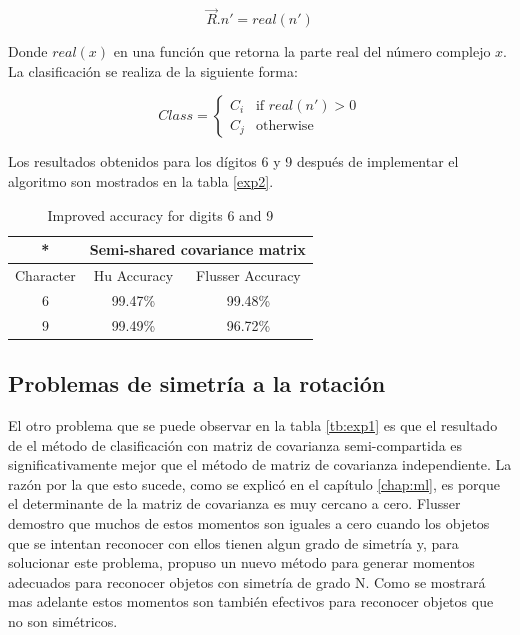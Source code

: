 \documentclass[a4paper, 11pt, oneside]{report}
\begin{document}
	\[ \vec{R}.n' = real(n') \]

Donde $real(x)$ en una función que retorna la parte real del número complejo $x$. La clasificación se realiza de la siguiente forma:

	\begin{equation}\label{angleClassif}
		Class = \left\{ \begin{array}{ll}
		C_i   & \mbox{if $real(n') > 0$} \\
		C_j & \mbox{otherwise}
	\end{array} \right. 
	\end{equation}

Los resultados obtenidos para los dígitos 6 y 9 después de implementar el algoritmo son mostrados en la tabla \ref{exp2}.	

	\begin{table}
	\begin{center}
	\begin{tabular}{|c|c|c|}
		\hline
		* & \multicolumn{2}{|c|}{Semi-shared covariance matrix} \\
		\hline
		Character & Hu Accuracy & Flusser Accuracy \\
		\hline
		6 & 99.47\% & 99.48\%	\\
		9 &	99.49\% & 96.72\% \\
		\hline
	\end{tabular}
	\end{center}
	\caption{Improved accuracy for digits 6 and 9}	
	\label{tb:exp2}
	\end{table}

\subsection{Problemas de simetría a la rotación}

El otro problema que se puede observar en la tabla \ref{tb:exp1} es que el resultado de el método de clasificación con matriz de covarianza semi-compartida es significativamente mejor que el método de matriz de covarianza independiente. La razón por la que esto sucede, como se explicó en el capítulo \ref{chap:ml}, es porque el determinante de la matriz de covarianza es muy cercano a cero. Flusser \cite{flusser06} demostro que muchos de estos momentos son iguales a cero cuando los objetos que se intentan reconocer con ellos tienen algun grado de simetría y, para solucionar este problema, propuso un nuevo método para generar momentos adecuados para reconocer objetos con simetría de grado N. Como se mostrará mas adelante estos momentos son también efectivos para reconocer objetos que no son simétricos.
\end{document}
